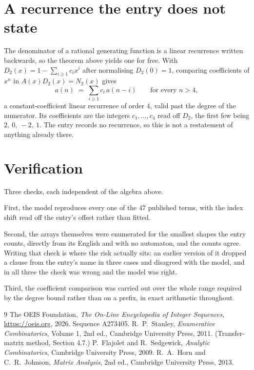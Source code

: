 \documentclass[11pt,a4paper]{article}
\theoremstyle{plain}
\theoremstyle{definition}
\begin{document}
\section{A recurrence the entry does not state}

The denominator of a rational generating function is a linear recurrence written backwards, so
the theorem above yields one for free. With $D_2(x)=1-\sum_{i\ge1}c_ix^i$ after normalising
$D_2(0)=1$, comparing coefficients of $x^n$ in $A(x)D_2(x)=N_2(x)$ gives
\[
a(n)\;=\;\sum_{i\ge1}c_i\,a(n-i)\qquad\text{for every }n>4,
\]
a constant-coefficient linear recurrence of order $4$, valid past the degree of the
numerator. Its coefficients are the integers $c_1,\dots,c_{4}$ read off $D_2$, the first few being $2,\ 0,\ -2,\ 1$. The entry records no recurrence, so this is not a restatement of anything
already there.

\section{Verification}

Three checks, each independent of the algebra above.

First, the model reproduces every one of the $47$ published terms, with the index shift
read off the entry's offset rather than fitted.

Second, the arrays themselves were enumerated for the smallest shapes the entry counts,
directly from its English and with no automaton, and the counts agree. Writing that check is
where the risk actually sits: an earlier version of it dropped a clause from the entry's name
in three cases and disagreed with the model, and in all three the check was wrong and the model
was right.

Third, the coefficient comparison was carried out over the whole range required by the degree
bound rather than on a prefix, in exact arithmetic throughout.

\begin{thebibliography}{9}
 The OEIS Foundation, \emph{The On-Line Encyclopedia of Integer
Sequences}, \url{https://oeis.org}, 2026. Sequence A273405.
 R.~P.~Stanley, \emph{Enumerative Combinatorics}, Volume 1, 2nd ed.,
Cambridge University Press, 2011. (Transfer-matrix method, Section 4.7.)
 P.~Flajolet and R.~Sedgewick, \emph{Analytic Combinatorics}, Cambridge
University Press, 2009.
 R.~A.~Horn and C.~R.~Johnson, \emph{Matrix Analysis}, 2nd ed., Cambridge
University Press, 2013.
\end{thebibliography}
\end{document}
